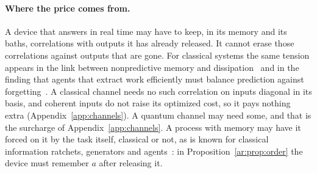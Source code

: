 \paragraph{Where the price comes from.} A device that answers in real time may have to keep, in its memory and its baths, correlations with outputs it has already released. It cannot erase those correlations against outputs that are gone. For classical systems the same tension appears in the link between nonpredictive memory and dissipation~\cite{Still12} and in the finding that agents that extract work efficiently must balance prediction against forgetting~\cite{Fiderer26}. A classical channel needs no such correlation on inputs diagonal in its basis, and coherent inputs do not raise its optimized cost, so it pays nothing extra (Appendix~\ref{app:channels}). A quantum channel may need some, and that is the surcharge of Appendix~\ref{app:channels}. A process with memory may have it forced on it by the task itself, classical or not, as is known for classical information ratchets, generators and agents~\cite{BMC18,LoomisCrutchfield20,Thompson25,Fiderer26}: in Proposition~\ref{ar:prop:order} the device must remember $a$ after releasing it.

